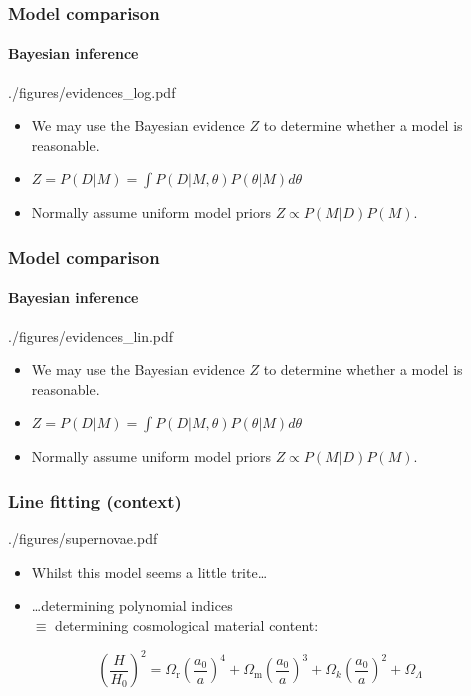 \documentclass[%
]{beamer}
\begin{document}
\begin{frame}
    \frametitle{Model comparison}
    \framesubtitle{Bayesian inference}
    \begin{figright}[0.33]{./figures/evidences_log.pdf}
        \begin{itemize}
            \item We may use the Bayesian evidence $Z$ to determine whether a model is reasonable.
            \item $Z = P(D|M) = \int P(D|M,\theta)P(\theta|M)d\theta$
            \item Normally assume uniform model priors $Z \propto P(M|D)P(M)$.
        \end{itemize}
    \end{figright}
\end{frame}
\begin{frame}
    \frametitle{Model comparison}
    \framesubtitle{Bayesian inference}
    \begin{figright}[0.33]{./figures/evidences_lin.pdf}
        \begin{itemize}
            \item We may use the Bayesian evidence $Z$ to determine whether a model is reasonable.
            \item $Z = P(D|M) = \int P(D|M,\theta)P(\theta|M)d\theta$
            \item Normally assume uniform model priors $Z \propto P(M|D)P(M)$.
        \end{itemize}
    \end{figright}
\end{frame}

\begin{frame}
    \frametitle{Line fitting (context)}
    \begin{figright}[0.5]{./figures/supernovae.pdf}
        \begin{itemize}
            \item Whilst this model seems a little trite\ldots
            \item\ldots determining polynomial indices \\$\equiv$ determining cosmological material content:
        \end{itemize}
    \end{figright}
        \[
            {\left( \frac{H}{H_0} \right)}^2 = 
            \Omega_\text{r} {\left( \frac{a_0}{a} \right)}^4+
            \Omega_\text{m} {\left( \frac{a_0}{a} \right)}^3+
            \Omega_k {\left( \frac{a_0}{a} \right)}^2+
            \Omega_\Lambda
            \]
\end{frame}
\end{document}
